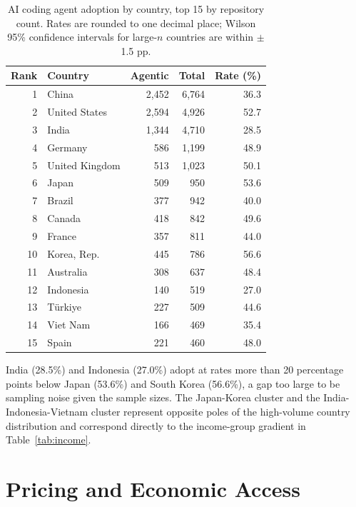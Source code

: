 \begin{table}[h]
\centering
\caption{AI coding agent adoption by country, top 15 by repository count. Rates are rounded to one decimal place; Wilson 95\% confidence intervals for large-$n$ countries are within $\pm$1.5 pp.}
\label{tab:country_counts}
\begin{tabular}{@{}rlrrr@{}}
\toprule
Rank & Country & Agentic & Total & Rate (\%) \\
\midrule
 1 & China          & 2,452 & 6,764 & 36.3 \\
 2 & United States  & 2,594 & 4,926 & 52.7 \\
 3 & India          & 1,344 & 4,710 & 28.5 \\
 4 & Germany        &   586 & 1,199 & 48.9 \\
 5 & United Kingdom &   513 & 1,023 & 50.1 \\
 6 & Japan          &   509 &   950 & 53.6 \\
 7 & Brazil         &   377 &   942 & 40.0 \\
 8 & Canada         &   418 &   842 & 49.6 \\
 9 & France         &   357 &   811 & 44.0 \\
10 & Korea, Rep.    &   445 &   786 & 56.6 \\
11 & Australia      &   308 &   637 & 48.4 \\
12 & Indonesia      &   140 &   519 & 27.0 \\
13 & T\"{u}rkiye    &   227 &   509 & 44.6 \\
14 & Viet Nam       &   166 &   469 & 35.4 \\
15 & Spain          &   221 &   460 & 48.0 \\
\bottomrule
\end{tabular}
\end{table}

India (28.5\%) and Indonesia (27.0\%) adopt at rates more than 20 percentage points below Japan (53.6\%) and South Korea (56.6\%), a gap too large to be sampling noise given the sample sizes. The Japan-Korea cluster and the India-Indonesia-Vietnam cluster represent opposite poles of the high-volume country distribution and correspond directly to the income-group gradient in Table~\ref{tab:income}.

\section{Pricing and Economic Access}
\label{sec:res:pricing}

